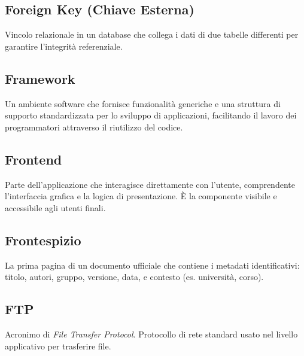 \documentclass[a4paper, 11pt, oneside]{scrartcl} %
\begin{document}
\vspace{0.5cm}

\subsection*{Foreign Key (Chiave Esterna)}
Vincolo relazionale in un database che collega i dati di due tabelle differenti per garantire l'integrità referenziale.
\vspace{0.5cm}

\subsection*{Framework}
Un ambiente software che fornisce funzionalità generiche e una struttura di supporto standardizzata per lo sviluppo di applicazioni, facilitando il lavoro dei programmatori attraverso il riutilizzo del codice.
\vspace{0.5cm}

\subsection*{Frontend}


Parte dell'applicazione che interagisce direttamente con l'utente, comprendente l'interfaccia grafica e la logica di presentazione. È la componente visibile e accessibile agli utenti finali.

\vspace{0.5cm}

\subsection*{Frontespizio}


La prima pagina di un documento ufficiale che contiene i metadati identificativi: titolo, autori, gruppo, versione, data, e contesto (es. università, corso).

\vspace{0.5cm}

\subsection*{FTP}
Acronimo di \textit{File Transfer Protocol}. Protocollo di rete standard usato nel livello applicativo per trasferire file.
\vspace{0.5cm}
\end{document}
